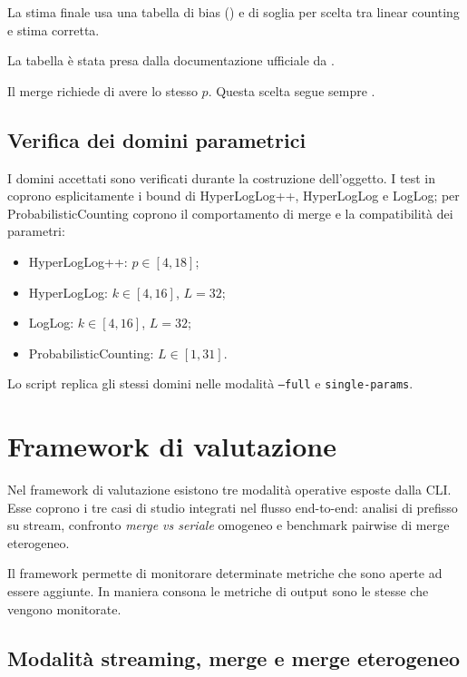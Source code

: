 La stima finale usa una tabella di bias
() e di soglia
 per scelta tra linear counting e stima corretta.

La tabella è stata presa dalla documentazione ufficiale da \cite{Heule_Nunkesser_Hall_2013}.

Il merge richiede di avere lo stesso \(p\).
Questa scelta segue sempre \cite{Heule_Nunkesser_Hall_2013}.

\subsection{Verifica dei domini parametrici}

I domini accettati sono verificati durante la costruzione dell'oggetto. 
I test in
 coprono esplicitamente i bound di HyperLogLog++,
HyperLogLog e LogLog; per ProbabilisticCounting coprono il comportamento di merge
e la compatibilità dei parametri:
\begin{itemize}
    \item HyperLogLog++: \(p \in [4,18]\);
    \item HyperLogLog: \(k \in [4,16]\), \(L=32\);
    \item LogLog: \(k \in [4,16]\), \(L=32\);
    \item ProbabilisticCounting: \(L \in [1,31]\).
\end{itemize}
Lo script  replica gli stessi domini
nelle modalità \texttt{--full} e \texttt{single-params}.

\section{Framework di valutazione}
Nel framework di valutazione esistono tre modalità operative esposte dalla
CLI. Esse coprono i tre casi di studio integrati nel flusso end-to-end:
analisi di prefisso su stream, confronto \emph{merge vs seriale} omogeneo e
benchmark pairwise di merge eterogeneo.

Il framework permette di monitorare determinate metriche che sono aperte ad essere aggiunte.
In maniera consona le metriche di output sono le stesse che vengono monitorate.


\subsection{Modalità streaming, merge e merge eterogeneo}

